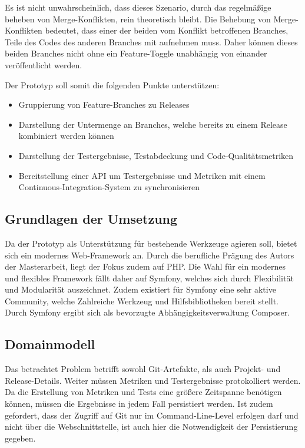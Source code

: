Es ist nicht unwahrscheinlich, dass dieses Szenario, durch das regelmäßige beheben von Merge-Konflikten, rein theoretisch bleibt. Die Behebung von Merge-Konflikten bedeutet, dass einer der beiden vom Konflikt betroffenen Branches, Teile des Codes des anderen Branches mit aufnehmen muss. Daher können dieses beiden Branches nicht ohne ein Feature-Toggle unabhängig von einander veröffentlicht werden.

Der Prototyp soll somit die folgenden Punkte unterstützen:
\begin{itemize}
\item Gruppierung von Feature-Branches zu Releases
\item Darstellung der Untermenge an Branches, welche bereits zu einem Release kombiniert werden können
\item Darstellung der Testergebnisse, Testabdeckung und Code-Qualitätsmetriken
\item Bereitstellung einer API um Testergebnisse und Metriken mit einem Continuous-Integration-System zu synchronisieren
\end{itemize}

\subsection{Grundlagen der Umsetzung}

Da der Prototyp als Unterstützung für bestehende Werkzeuge agieren soll, bietet sich ein modernes Web-Framework an. Durch die berufliche Prägung des Autors der Masterarbeit, liegt der Fokus zudem auf PHP. Die Wahl für ein modernes und flexibles Framework fällt daher auf Symfony, welches sich durch Flexibilität und Modularität auszeichnet. Zudem existiert für Symfony eine sehr aktive Community, welche Zahlreiche Werkzeug und Hilfsbibliotheken bereit stellt. Durch Symfony ergibt sich als bevorzugte Abhängigkeitsverwaltung Composer. 

\subsection{Domainmodell}

Das betrachtet Problem betrifft sowohl Git-Artefakte, als auch Projekt- und Release-Details. Weiter müssen Metriken und Testergebnisse protokolliert werden. Da die Erstellung von Metriken und Tests eine größere Zeitspanne benötigen können, müssen die Ergebnisse in jedem Fall persistiert werden. Ist zudem gefordert, dass der Zugriff auf Git nur im Command-Line-Level erfolgen darf und nicht über die Webschnittstelle, ist auch hier die Notwendigkeit der Persistierung gegeben.

